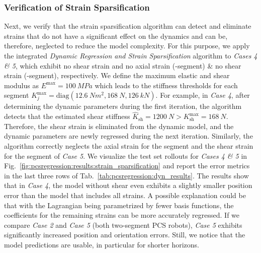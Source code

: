 \subsubsection{Verification of Strain Sparsification}
Next, we verify that the strain sparsification algorithm can detect and eliminate strains that do not have a significant effect on the dynamics and can be, therefore, neglected to reduce the model complexity.
For this purpose, we apply the integrated \emph{Dynamic Regression and Strain Sparsification} algorithm to \emph{Cases 4 \& 5}, which exhibit no shear strain and no axial strain (-segment) \& no shear strain (-segment), respectively.
We define the maximum elastic and shear modulus as $E^\mathrm{max} = \SI{100}{MPa}$ which leads to the stiffness thresholds for each segment $K_j^\mathrm{max} = \mathrm{diag}(\SI{12.6}{Nm^2}, \SI{168}{N}, \SI{126}{kN})$.
For example, in \emph{Case 4}, after determining the dynamic parameters during the first iteration, the algorithm detects that the estimated shear stiffness $\hat{K}_\mathrm{sh} = \SI{1200}{N} > K_\mathrm{sh}^\mathrm{max} = \SI{168}{N}$. Therefore, the shear strain is eliminated from the dynamic model, and the dynamic parameters are newly regressed during the next iteration.
Similarly, the algorithm correctly neglects the axial strain for the  segment and the shear strain for the  segment of \emph{Case 5}.
We visualize the test set rollouts for \emph{Cases 4 \& 5} in Fig.~\ref{fig:pcsregression:results:strain_sparsification} and report the error metrics in the last three rows of Tab.~\ref{tab:pcsregression:dyn_results}.
The results show that in \emph{Case 4}, the model without shear even exhibits a slightly smaller position error than the model that includes all strains. A possible explanation could be that with the Lagrangian being parametrized by fewer basis functions, the coefficients for the remaining strains can be more accurately regressed.
If we compare \emph{Case 2} and \emph{Case 5} (both two-segment \gls{PCS} robots), \emph{Case 5} exhibits significantly increased position and orientation errors. Still, we notice that the model predictions are usable, in particular for shorter horizons.

